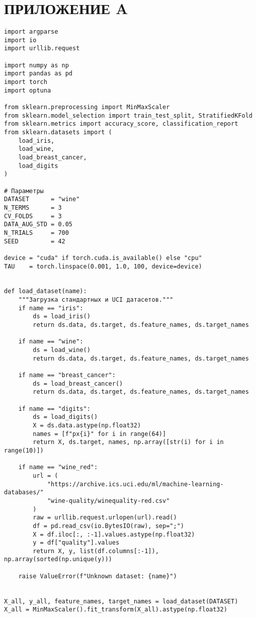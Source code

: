 \newpage
\section*{ПРИЛОЖЕНИЕ A}
\eskdrerun{}
\begin{verbatim}
import argparse
import io
import urllib.request

import numpy as np
import pandas as pd
import torch
import optuna

from sklearn.preprocessing import MinMaxScaler
from sklearn.model_selection import train_test_split, StratifiedKFold
from sklearn.metrics import accuracy_score, classification_report
from sklearn.datasets import (
    load_iris,
    load_wine,
    load_breast_cancer,
    load_digits
)

# Параметры
DATASET      = "wine"
N_TERMS      = 3
CV_FOLDS     = 3
DATA_AUG_STD = 0.05
N_TRIALS     = 700
SEED         = 42

device = "cuda" if torch.cuda.is_available() else "cpu"
TAU    = torch.linspace(0.001, 1.0, 100, device=device)


def load_dataset(name):
    """Загрузка стандартных и UCI датасетов."""
    if name == "iris":
        ds = load_iris()
        return ds.data, ds.target, ds.feature_names, ds.target_names

    if name == "wine":
        ds = load_wine()
        return ds.data, ds.target, ds.feature_names, ds.target_names

    if name == "breast_cancer":
        ds = load_breast_cancer()
        return ds.data, ds.target, ds.feature_names, ds.target_names

    if name == "digits":
        ds = load_digits()
        X = ds.data.astype(np.float32)
        names = [f"px{i}" for i in range(64)]
        return X, ds.target, names, np.array([str(i) for i in range(10)])

    if name == "wine_red":
        url = (
            "https://archive.ics.uci.edu/ml/machine-learning-databases/"
            "wine-quality/winequality-red.csv"
        )
        raw = urllib.request.urlopen(url).read()
        df = pd.read_csv(io.BytesIO(raw), sep=";")
        X = df.iloc[:, :-1].values.astype(np.float32)
        y = df["quality"].values
        return X, y, list(df.columns[:-1]), np.array(sorted(np.unique(y)))

    raise ValueError(f"Unknown dataset: {name}")


X_all, y_all, feature_names, target_names = load_dataset(DATASET)
X_all = MinMaxScaler().fit_transform(X_all).astype(np.float32)


\end{verbatim}
